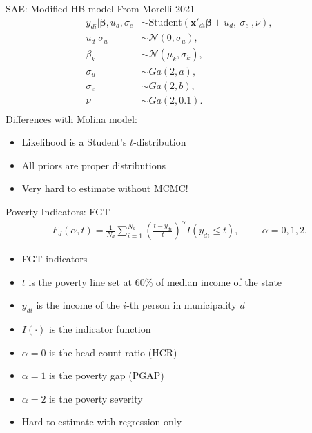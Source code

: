 \begin{frame}{SAE: Modified HB model}
    From Morelli 2021
    \begin{equation*}
        \begin{split}
            y_{di} |\boldsymbol \beta, u_d, \sigma_e & \sim
            \text{Student}(\boldsymbol{x'}_{di} \boldsymbol \beta + u_d,\ \sigma_e\ , \nu), \\
            u_d | \sigma_u & \sim \mathcal N(0, \sigma_u),\  \\
            \beta_k & \sim \mathcal N(\mu_k, \sigma_k),\\
            \sigma_u & \sim Ga(2, a), \\
            \sigma_e & \sim Ga(2, b), \\
            \nu & \sim Ga(2, 0.1). \\
        \end{split}
        \label{eq:mod_hb}
    \end{equation*}
    Differences with Molina model:
    \begin{itemize}
        \item Likelihood is a Student's $t$-distribution
        \item All priors are proper distributions
        \item Very hard to estimate without MCMC!
    \end{itemize}
\end{frame}

\begin{frame}{Poverty Indicators: FGT}
    \vspace{-2cm}
    \begin{gather*}
        F_d(\alpha, t) = \displaystyle \frac 1 {N_d} \sum_{i=1}^{N_d}\left( \frac{t - y_{di}}{t} \right)^\alpha I (y_{di} \le t),
        \hspace{1cm}\alpha = 0, 1, 2.
    \end{gather*}

    \begin{itemize}
        \item FGT-indicators \cite{foster_class_1984}
        \item $t$ is the poverty line set at 60\% of median income of the state
        \item $y_{di}$ is the income of the $i$-th person in municipality $d$
        \item $I(\cdot)$ is the indicator function
        \item $\alpha = 0$ is the head count ratio (HCR)
        \item $\alpha = 1$ is the poverty gap (PGAP)
        \item $\alpha = 2$ is the poverty severity
        \item Hard to estimate with regression only
    \end{itemize}
\end{frame}


